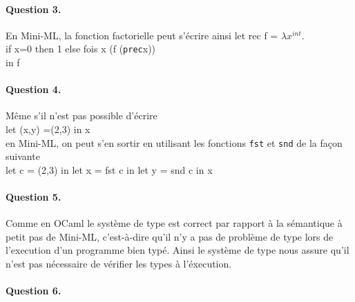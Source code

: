 \documentclass{article}
\theoremstyle{thm}
\theoremstyle{def}
\theoremstyle{dem}
\newcommand{\code}[1]{\texttt{#1}}
\begin{document}
	\paragraph{Question 3.}
	En Mini-ML, la fonction factorielle peut s'écrire ainsi
	let rec f = $\lambda x^{int}$.\\
	if x=0 then 1 else fois x (f (\code{prec}x))\\
	in f\\

	\paragraph{Question 4.}
	Même s'il n'est pas possible d'écrire\\
	let (x,y) =(2,3) in x\\
	en Mini-ML, on peut s'en sortir en utilisant les fonctions \code{fst} et \code{snd} de la façon suivante\\
	let c = (2,3) in let x = fst c in let y = snd c in x

	\paragraph{Question 5.}
	Comme en OCaml le système de type est correct par rapport à la sémantique à petit pas de Mini-ML, c'est-à-dire qu'il n'y a pas de problème de type lors de l'execution d'un programme bien typé. Ainsi le système de type nous assure qu'il n'est pas nécessaire de vérifier les types à l'éxecution.

	\paragraph{Question 6.}

	
\end{document}
